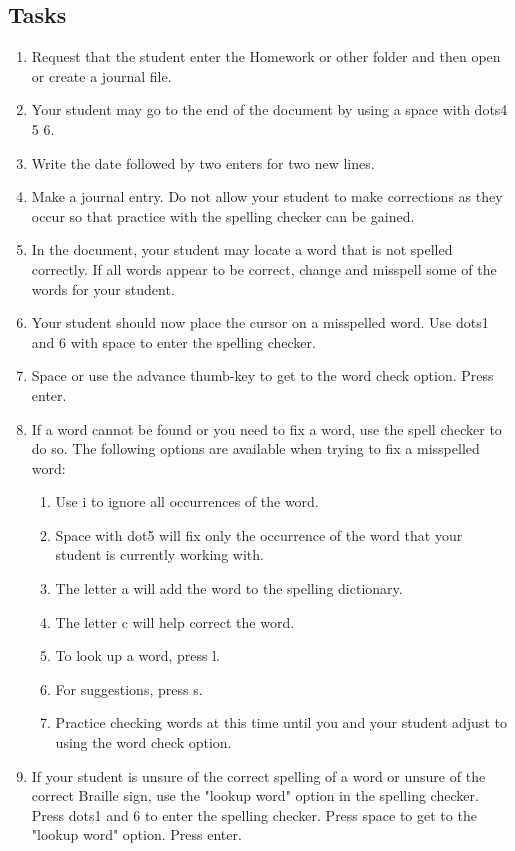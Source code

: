 \documentclass[10pt,letterpaper,twoside]{report}
\begin{document}
{{{\subsection{Tasks}
\begin{enumerate}
	\item Request that the student enter the Homework or other folder and then open or create a journal file.
	\item Your student may go to the end of the document by using a space with dots4 5 6.
	\item Write the date followed by two enters for two new lines.
	\item Make a journal entry.  Do not allow your student to make corrections as they occur so that practice with the spelling checker can be gained.
	\item In the document, your student may locate a word that is not spelled correctly.  If all words appear to be correct, change and misspell some of the words for your student.
	\item Your student should now place the cursor on a misspelled word.  Use dots1 and 6 with space to enter the spelling checker.
	\item Space or use the advance thumb-key to get to the word check option.  Press enter.
	\item If a word cannot be found or you need to fix a word, use the spell checker to do so.  The following options are available when trying to fix a misspelled word:
	      \begin{enumerate}
		      \item Use i to ignore all occurrences of the word.
		      \item Space with dot5 will fix only the occurrence of the word that your student is currently working with.
		      \item The letter a will add the word to the spelling dictionary.
		      \item The letter c will help correct the word.
		      \item To look up a word, press l.
		      \item For suggestions, press s.
		      \item Practice checking words at this time until you and your student adjust to using the word check option.
	      \end{enumerate}
	\item If your student is unsure of the correct spelling of a word or unsure of the correct Braille sign, use the "lookup word" option in the spelling checker.  Press dots1 and 6 to enter the spelling checker.  Press space to get to the "lookup word" option.  Press enter.

\end{enumerate}}}}
\end{document}
